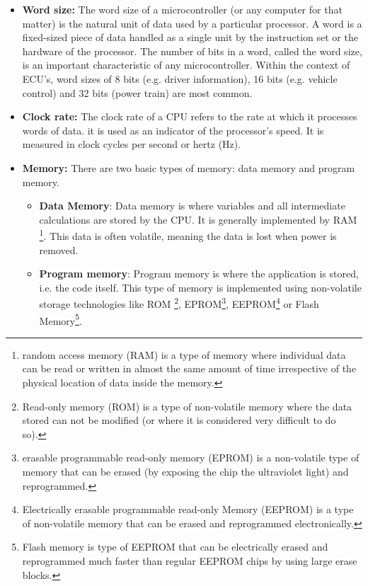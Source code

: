 \documentclass[master=cws,masteroption=vs,english]{kulemt}
\begin{document}
\begin{itemize}
	\item \textbf{Word size:} The word size of a microcontroller (or any computer for that matter) is the natural unit of data used by a particular processor. A word is a fixed-sized piece of data handled as a single unit by the instruction set or the hardware of the processor. The number of bits in a word, called the word size, is an important characteristic of any microcontroller. Within the context of ECU's, word sizes of 8 bits (e.g. driver information), 16 bits (e.g. vehicle control) and 32 bits (power train) are most common.\cite{ECU}
	
	\item \textbf{Clock rate:} The clock rate of a CPU refers to the rate at which it processes words of data. it is used as an indicator of the processor's speed. It is measured in clock cycles per second or hertz (Hz). 
	
	\item \textbf{Memory:} There are two basic types of memory: data memory and program memory.
	\begin{itemize}
		\item \textbf{Data Memory}: Data memory is where variables and all intermediate calculations are stored by the CPU. It is generally implemented by RAM \footnote{random access memory (RAM) is a type of memory where individual data can be read or written in almost the same amount of time irrespective of the physical location of data inside the memory.}. This data is often volatile, meaning the data is lost when power is removed.
		
		\item \textbf{Program memory}: Program memory is where the application is stored, i.e. the code itself. This type of memory is implemented using non-volatile storage technologies like ROM \footnote{Read-only memory (ROM) is a type of non-volatile memory where the data stored can not be modified (or where it is considered very difficult to do so).}, EPROM\footnote{erasable programmable read-only memory (EPROM) is a non-volatile type of memory that can be erased (by exposing the chip the ultraviolet light) and reprogrammed.}, EEPROM\footnote{Electrically erasable programmable read-only Memory (EEPROM) is a type of non-volatile memory that can be erased and reprogrammed electronically.} or Flash Memory\footnote{Flash memory is type of EEPROM  that can be electrically erased and reprogrammed much faster than regular EEPROM chips by using large erase blocks.}.
	\end{itemize}
	

\end{itemize}
\end{document}
